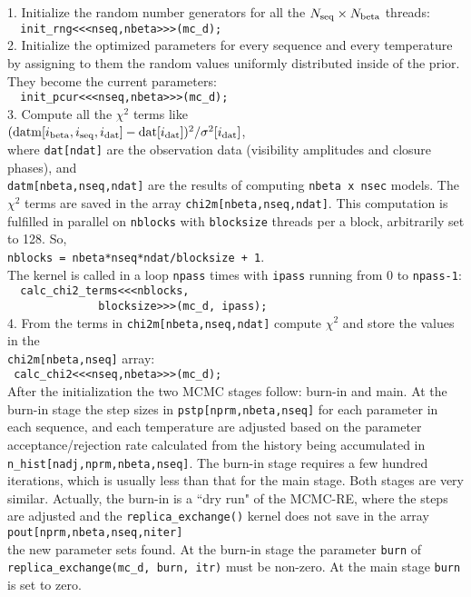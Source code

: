 \documentclass[preprint2]{aastex}
\begin{document}
1. Initialize the random number generators for all the $N_{\rm seq} \times N_{\rm beta}$ threads: \\ 
\verb|  init_rng<<<nseq,nbeta>>>(mc_d);| \\

2. Initialize the optimized parameters for every sequence and every temperature by assigning to them the random values uniformly distributed inside of the prior. They become the current parameters: \\
\verb|  init_pcur<<<nseq,nbeta>>>(mc_d);| \\

3. Compute all the $\chi^2$ terms like \\
$({\rm datm}[i_{\rm beta},i_{\rm seq},i_{\rm dat}] - {\rm dat}[i_{\rm dat}])^2/\sigma^2[i_{\rm dat}]$, \\
where \verb|dat[ndat]| are the observation data (visibility amplitudes and closure phases), and \\
\verb|datm[nbeta,nseq,ndat]| are the results of computing \verb|nbeta x nsec| models. The $\chi^2$ terms are 
saved in the array \verb|chi2m[nbeta,nseq,ndat]|. This computation is fulfilled in parallel on \verb|nblocks| with \verb|blocksize| threads per a block, arbitrarily set to 128. So, \\ 
\verb|nblocks = nbeta*nseq*ndat/blocksize + 1|. \\

The kernel is called in a loop \verb|npass| times with \verb|ipass| running from 0 to \verb|npass-1|: \\
\verb|  calc_chi2_terms<<<nblocks,| \\ 
\verb|              blocksize>>>(mc_d, ipass);| \\
    
4. From the terms in \verb|chi2m[nbeta,nseq,ndat]| compute  $\chi^2$ and store the values in the \\
\verb|chi2m[nbeta,nseq]| array: \\
\verb| calc_chi2<<<nseq,nbeta>>>(mc_d);| \\

After the initialization the two MCMC stages follow: burn-in and main. At the burn-in stage 
the step sizes in \verb|pstp[nprm,nbeta,nseq]|
for each parameter in each sequence, and each temperature are adjusted based on the parameter acceptance/rejection rate calculated from the history being accumulated in \\
\verb|n_hist[nadj,nprm,nbeta,nseq]|.
 The burn-in stage 
requires a few hundred iterations, which is usually less than that for the main stage. 
Both stages are very similar. Actually, the burn-in is a ``dry run" of the MCMC-RE, where
the steps are adjusted and 
the \verb|replica_exchange()| kernel does not save in the array \\
\verb|pout[nprm,nbeta,nseq,niter]| \\
the new parameter sets found. At the burn-in stage the parameter \verb|burn| of \\
\verb|replica_exchange(mc_d, burn, itr)| 
 must be non-zero. At the main stage \verb|burn| is set to zero. \\
\end{document}
